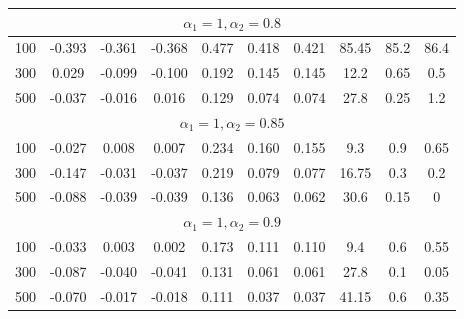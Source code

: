 \begin{table}[]
\begin{tabular}{lccccccccc}
		\multicolumn{10}{c}{$\alpha_1 = 1, \alpha_2 = 0.8$}                                                                                                                           \\ \hline
		\multicolumn{1}{l|}{100}                & -0.393 & -0.361 & \multicolumn{1}{c|}{-0.368} & 0.477 & 0.418 & \multicolumn{1}{c|}{0.421} & 85.45        & 85.2       & 86.4       \\
		\multicolumn{1}{l|}{300}                & 0.029  & -0.099 & \multicolumn{1}{c|}{-0.100} & 0.192 & 0.145 & \multicolumn{1}{c|}{0.145} & 12.2         & 0.65       & 0.5        \\
		\multicolumn{1}{l|}{500}                & -0.037 & -0.016 & \multicolumn{1}{c|}{0.016}  & 0.129 & 0.074 & \multicolumn{1}{c|}{0.074} & 27.8         & 0.25       & 1.2        \\ \hline
		\multicolumn{10}{c}{$\alpha_1 = 1, \alpha_2 = 0.85$}                                                                                                                          \\ \hline
		\multicolumn{1}{l|}{100}                & -0.027 & 0.008  & \multicolumn{1}{c|}{0.007}  & 0.234 & 0.160 & \multicolumn{1}{c|}{0.155} & 9.3          & 0.9        & 0.65       \\
		\multicolumn{1}{l|}{300}                & -0.147 & -0.031 & \multicolumn{1}{c|}{-0.037} & 0.219 & 0.079 & \multicolumn{1}{c|}{0.077} & 16.75        & 0.3        & 0.2        \\
		\multicolumn{1}{l|}{500}                & -0.088 & -0.039 & \multicolumn{1}{c|}{-0.039} & 0.136 & 0.063 & \multicolumn{1}{c|}{0.062} & 30.6         & 0.15       & 0          \\ \hline
		\multicolumn{10}{c}{$\alpha_1 = 1, \alpha_2 = 0.9$}                                                                                                                           \\ \hline
		\multicolumn{1}{l|}{100}                & -0.033 & 0.003  & \multicolumn{1}{c|}{0.002}  & 0.173 & 0.111 & \multicolumn{1}{c|}{0.110} & 9.4          & 0.6        & 0.55       \\
		\multicolumn{1}{l|}{300}                & -0.087 & -0.040 & \multicolumn{1}{c|}{-0.041} & 0.131 & 0.061 & \multicolumn{1}{c|}{0.061} & 27.8         & 0.1        & 0.05       \\
		\multicolumn{1}{l|}{500}                & -0.070 & -0.017 & \multicolumn{1}{c|}{-0.018} & 0.111 & 0.037 & \multicolumn{1}{c|}{0.037} & 41.15        & 0.6        & 0.35       \\ \hline

\end{tabular}
\end{table}
